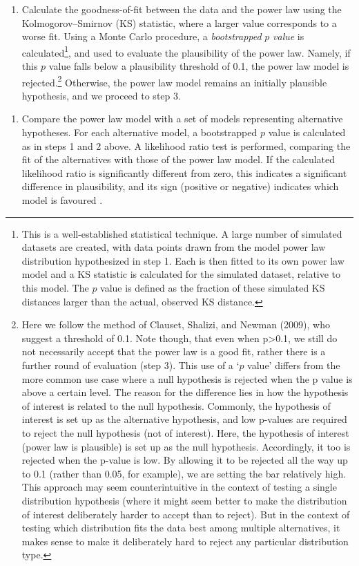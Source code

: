 \begin{enumerate}
\def\labelenumi{\arabic{enumi}.}
\setcounter{enumi}{1}
\tightlist
\item
  Calculate the goodness-of-fit between the data and the power law using the Kolmogorov--Smirnov (KS) statistic, where a larger value corresponds to a worse fit. Using a Monte Carlo procedure, a \emph{bootstrapped} \(p\) \emph{value} is calculated\footnote{This is a well-established statistical technique. A large number of simulated datasets are created, with data points drawn from the model power law distribution hypothesized in step 1. Each is then fitted to its own power law model and a KS statistic is calculated for the simulated dataset, relative to this model. The \(p\) value is defined as the fraction of these simulated KS distances larger than the actual, observed KS distance.}, and used to evaluate the plausibility of the power law. Namely, if this \(p\) value falls below a plausibility threshold of 0.1, the power law model is rejected.\footnote{Here we follow the method of Clauset, Shalizi, and Newman (2009), who suggest a threshold of 0.1. Note though, that even when p\textgreater{}0.1, we still do not necessarily accept that the power law is a good fit, rather there is a further round of evaluation (step 3). This use of a `\(p\) value' differs from the more common use case where a null hypothesis is rejected when the p value is above a certain level. The reason for the difference lies in how the hypothesis of interest is related to the null hypothesis. Commonly, the hypothesis of interest is set up as the alternative hypothesis, and low p-values are required to reject the null hypothesis (not of interest). Here, the hypothesis of interest (power law is plausible) is set up as the null hypothesis. Accordingly, it too is rejected when the p-value is low. By allowing it to be rejected all the way up to 0.1 (rather than 0.05, for example), we are setting the bar relatively high. This approach may seem counterintuitive in the context of testing a single distribution hypothesis (where it might seem better to make the distribution of interest deliberately harder to accept than to reject). But in the context of testing which distribution fits the data best among multiple alternatives, it makes sense to make it deliberately hard to reject any particular distribution type.} Otherwise, the power law model remains an initially plausible hypothesis, and we proceed to step 3.
\end{enumerate}

\begin{enumerate}
\def\labelenumi{\arabic{enumi}.}
\setcounter{enumi}{2}
\tightlist
\item
  Compare the power law model with a set of models representing alternative hypotheses. For each alternative model, a bootstrapped \(p\) value is calculated as in steps 1 and 2 above. A likelihood ratio test is performed, comparing the fit of the alternatives with those of the power law model. If the calculated likelihood ratio is significantly different from zero, this indicates a significant difference in plausibility, and its sign (positive or negative) indicates which model is favoured \autocite[p.~680]{clauset_power-law_2009}.
\end{enumerate}

